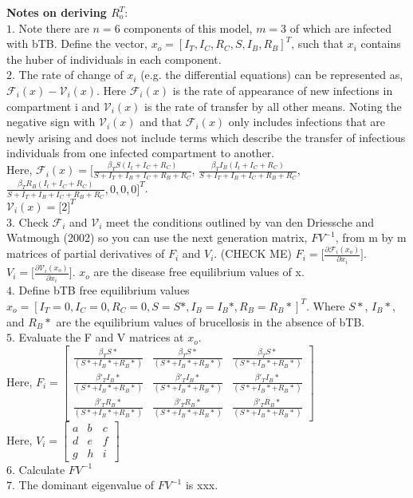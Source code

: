 \documentclass[letterpaper,12pt]{article}
\begin{document}
\pagebreak 
\noindent
\textbf{Notes on deriving $R_{o}^{T}$}: \\
 $1.$ Note there are $n = 6$ components of this model, $m = 3$ of which are infected with bTB.  Define the vector, $x_o = [I_T, I_C, R_C, S, I_B, R_B]^T$, such that $x_i$ contains the huber of individuals in each component. \\
 $2. $  The rate of change of $x_i$ (e.g. the differential equations) can be represented as, $\mathcal{F}_i(x) - \mathcal{V}_i (x)$.  
 Here $\mathcal{F}_i (x)$ is the rate of appearance of new infections in compartment i and $\mathcal{V}_i (x)$ is the rate of transfer by all other means. 
Noting the negative sign with $\mathcal{V}_i (x)$ and that $\mathcal{F}_i (x)$ only includes infections that are newly arising and does not include terms which describe the transfer of infectious individuals from one infected compartment to another. \\
 Here, $\mathcal{F}_i (x) = \Big[\frac{\beta_T S (I_t + I_C+ R_C)}{S + I_T + I_B + I_C + R_B + R_C}$, $\frac{\beta_{T} I_B (I_t + I_C+ R_C)}{S + I_T + I_B + I_C + R_B + R_C}$, $\frac{\beta_{T} R_B (I_t + I_C+ R_C)}{S + I_T + I_B + I_C + R_B + R_C}, 0, 0, 0\Big]^T$. \\
  $\mathcal{V}_i (x) =\Big[ 2 \Big]^T$ \\
$3.$ Check $\mathcal{F}_i$ and $\mathcal{V}_i$ meet the conditions outlined by van den Driessche and Watmough (2002) so you can use the next generation matrix,  $FV^{-1}$, from m by m matrices of partial derivatives of $F_i$ and $V_i$.   (CHECK ME)
$F_i = \Big[\frac{\partial \mathcal{F}_i (x_o)}{\partial x_i} \Big]$.  $V_i = \Big[\frac{\partial \mathcal{V}_i (x_o)}{\partial x_i} \Big]$.  $x_o$ are the disease free equilibrium values of x.\\
$4.$ Define bTB free equilibrium values $x_o = [I_T = 0, I_C = 0, R_C = 0, S = S*, I_B= I_B*, R_B = R_B*]^T$.  Where $S*$, $I_B*$, and $R_B*$ are the equilibrium values of brucellosis in the absence of bTB.  \\
$5.$ Evaluate the F and V matrices at $x_o$.  \\
Here, $F_i = \begin{bmatrix} \frac{\beta_T S*}{(S* + I_B* + R_B*)} & \frac{\beta_T S*}{(S* + I_B* + R_B*)} & \frac{\beta_T S*}{(S* + I_B* + R_B*)} \\ 
\frac{\beta'_T I_B*}{(S* + I_B* + R_B*)}  & \frac{\beta'_T I_B*}{(S* + I_B* + R_B*)} & \frac{\beta'_T I_B*}{(S* + I_B* + R_B*)} \\
\frac{ \beta'_T R_B*}{(S* + I_B* + R_B*)} & \frac{ \beta'_T R_B*}{(S* + I_B* + R_B*)} & \frac{ \beta'_T R_B*}{(S* + I_B* + R_B*)} \end{bmatrix}$ \\
Here, $V_i = \begin{bmatrix} a&b&c \\ d&e&f \\ g&h&i \end{bmatrix}$ \\
$6.$ Calculate $FV^{-1}$ \\
$7.$ The dominant eigenvalue of $FV^{-1}$ is xxx. \\
\end{document}
